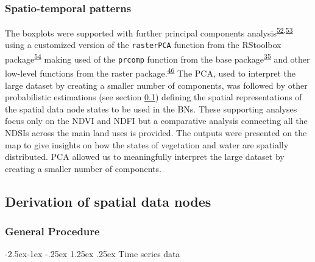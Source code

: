 \documentclass[12pt,oneside]{article}
\makeatletter
\renewcommand\paragraph{\@startsection{paragraph}{4}{\z@}%
            {-2.5ex\@plus -1ex \@minus -.25ex}%
            {1.25ex \@plus .25ex}%
            {\normalfont\normalsize\bfseries}}
\makeatother
\begin{document}
\hypertarget{I42}{%
\subsubsection{Spatio-temporal patterns}\label{I42}}

The boxplots were supported with further principal components analysis\textsuperscript{\protect\hyperlink{ref-Mardia_et_al_1979}{52},\protect\hyperlink{ref-Pearson_1901}{53}} using a customized version of the \texttt{rasterPCA} function from the RStoolbox package\textsuperscript{\protect\hyperlink{ref-Leutner_et_al_2019}{54}} making used of the \texttt{prcomp} function from the base package\textsuperscript{\protect\hyperlink{ref-RCoreTeam_2018}{35}} and other low-level functions from the raster package.\textsuperscript{\protect\hyperlink{ref-Hijmans_2019}{46}} The PCA, used to interpret the large dataset by creating a smaller number of components, was followed by other probabilistic estimations (see section \ref{I5}) defining the spatial representations of the spatial data node states to be used in the BNs. These supporting analyses focus only on the NDVI and NDFI but a comparative analysis connecting all the NDSIs across the main land uses is provided. The outputs were presented on the map to give insights on how the states of vegetation and water are spatially distributed. PCA allowed us to meaningfully interpret the large dataset by creating a smaller number of components.

\hypertarget{I5}{%
\subsection{Derivation of spatial data nodes}\label{I5}}

\hypertarget{I51}{%
\subsubsection{General Procedure}\label{I51}}

\hypertarget{I511}{%
\paragraph{Time series data}\label{I511}}
\end{document}

